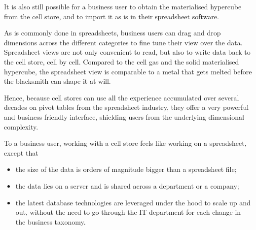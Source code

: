 \documentclass{vldb}
\begin{document}
It is also still possible for a business user to obtain the materialised hypercube from the cell store, and to import it as is in their spreadsheet software.

As is commonly done in spreadsheets, business users can drag and drop dimensions across the different categories to fine tune their view over the data. Spreadsheet views are not only convenient to read, but also to write data back to the cell store, cell by cell. Compared to the cell gas and the solid materialised hypercube, the spreadsheet view is comparable to a metal that gets melted before the blacksmith can shape it at will.

Hence, because cell stores can use all the experience accumulated over several decades on pivot tables from the spreadsheet industry, they offer a very powerful and business friendly interface, shielding users from the underlying dimensional complexity.

To a business user, working with a cell store feels like working on a spreadsheet, except that

\begin{itemize}
\item the size of the data is orders of magnitude bigger than a spreadsheet file;
\item the data lies on a server and is shared across a department or a company;
\item the latest database technologies are leveraged under the hood to scale up and out, without the need to go through the IT department for each change in the business taxonomy.
\end{itemize}
\end{document}
